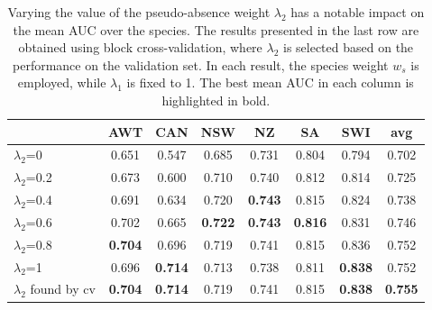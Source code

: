 
\begin{table}[]
\centering
\caption{Varying the value of the pseudo-absence weight $\lambda_2$ has a notable impact on the mean AUC over the species. The results presented in the last row are obtained using block cross-validation, where $\lambda_2$ is selected based on the performance on the validation set.
In each result, the species weight $w_s$ is employed, while $\lambda_1$ is fixed to 1. The best mean AUC in each column is highlighted in bold.}

\setlength{\tabcolsep}{0.46\tabcolsep}  %
\renewcommand{\arraystretch}{1.2} %
\begin{tabular}{l|cccccc|c}
                        & AWT   & CAN   & NSW   & NZ    & SA    & SWI   & avg   \\ \hline \hline
$\lambda_2 $=0          & 0.651 & 0.547 & 0.685 & 0.731 & 0.804 & 0.794 & 0.702 \\
$\lambda_2 $=0.2        & 0.673 & 0.600 & 0.710 & 0.740 & 0.812 & 0.814 & 0.725 \\
$\lambda_2 $=0.4        & 0.691 & 0.634 & 0.720 & \textbf{0.743} & 0.815 & 0.824 & 0.738 \\
$\lambda_2 $=0.6        & 0.702 & 0.665 & \textbf{0.722} & \textbf{0.743} & \textbf{0.816} & 0.831 & 0.746 \\
$\lambda_2 $=0.8        & \textbf{0.704} & 0.696 & 0.719 & 0.741 & 0.815 & 0.836 & 0.752 \\
$\lambda_2 $=1          & 0.696 & \textbf{0.714} & 0.713 & 0.738 & 0.811 & \textbf{0.838} & 0.752 \\
\hline
$\lambda_2 $ found by cv & \textbf{0.704} & \textbf{0.714} & 0.719 & 0.741 & 0.815 & \textbf{0.838} & \textbf{0.755} \\
 \hline
 
\end{tabular}

\label{tab:lambda2}
\end{table}
